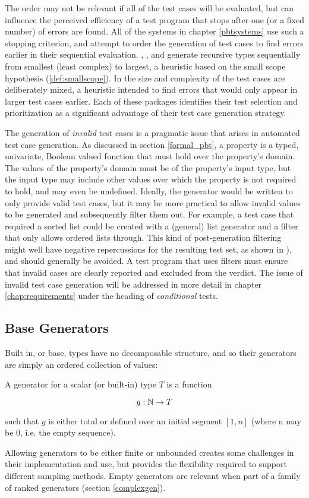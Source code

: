 The order may not be relevant if all of the test cases will be evaluated,
but can influence the perceived efficiency of a test program
that stops after one (or a fixed number) of errors are found.
All of the \pbt systems in chapter \ref{pbtsystems} use such a stopping criterion,
and attempt to order the generation of test cases to find errors earlier
in their sequential evaluation.
\QC, \SC, and \FEAT generate recursive types sequentially 
from smallest (least complex) to largest,
a heuristic based on the small scope hypothesis (\ref{def:smallscope}).
In \EC the size and complexity of the test cases are deliberately mixed,
a heuristic intended to find errors that would only appear in larger test cases earlier.
Each of these packages identifies their test selection and prioritization as 
a significant advantage of their test case generation strategy.

The generation of \emph{invalid} test cases is a pragmatic issue that arises 
in automated test case generation.
As discussed in section \ref{formal_pbt},
a property is a typed, univariate, Boolean valued function
that must hold over the property's domain.
The values of the property's domain must be of the property's input type,
but the input type may include other values over which 
the property is not required to hold, and may even be undefined.
Ideally, the generator would be written to only provide valid test cases,
but it may be more practical to allow invalid values to be generated
and subsequently filter them out.
For example,
a test case that required a sorted list could be 
created with a (general) list generator
and a filter that only allows ordered lists through.
This kind of post-generation filtering might well have negative repercussions for the resulting test set,
as shown in \cite{Claessen2000}),
and should generally be avoided.
A test program that uses filters must ensure that 
invalid cases are clearly reported and excluded from the verdict.
The issue of invalid test case generation will be addressed in more detail
in chapter \ref{chap:requirements} under the heading of \emph{conditional} tests.

\subsection{Base Generators}\label{sub:basegen}
Built in, or base,  types have no decomposable structure,
and so their generators are simply an ordered collection of values:

\begin{df}
A generator for a scalar (or built-in) type $T$ is a function 

$$g: \mathbb{N} \rightarrow T$$

\noindent
such that $g$ is either total
or defined over an initial segment $[1,n]$ (where n may be 0, i.e. the empty sequence).
\end{df}
\noindent
Allowing generators to be either finite or unbounded 
creates some challenges in their implementation and use,
but provides the flexibility required to support different sampling methods.
Empty generators are relevant when part of a family of ranked generators (section \ref{complexgen}).

